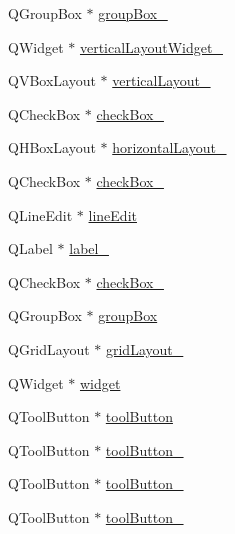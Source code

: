 \begin{DoxyCompactItemize}
Q\-Group\-Box $\ast$ \hyperlink{class_ui___shape_population_viewer_a645bc1a3805b989bfb60fdd4835c88d6}{group\-Box\-\_}
\item 
Q\-Widget $\ast$ \hyperlink{class_ui___shape_population_viewer_a5ab614d7c8de8e7d5c9f347e6a533776}{vertical\-Layout\-Widget\-\_}
\item 
Q\-V\-Box\-Layout $\ast$ \hyperlink{class_ui___shape_population_viewer_a41bb6c41ce83be21aade5f5f1cc14b4b}{vertical\-Layout\-\_}
\item 
Q\-Check\-Box $\ast$ \hyperlink{class_ui___shape_population_viewer_a1d0b21459e70bf50df0d7b096584baaf}{check\-Box\-\_}
\item 
Q\-H\-Box\-Layout $\ast$ \hyperlink{class_ui___shape_population_viewer_a9951cfa48bbeac90b3149d41bc5e9b51}{horizontal\-Layout\-\_}
\item 
Q\-Check\-Box $\ast$ \hyperlink{class_ui___shape_population_viewer_a9987cfb8cc28c513d88fd4fda358172f}{check\-Box\-\_}
\item 
Q\-Line\-Edit $\ast$ \hyperlink{class_ui___shape_population_viewer_a76a73443281f9294843ac1e2e67822ce}{line\-Edit}
\item 
Q\-Label $\ast$ \hyperlink{class_ui___shape_population_viewer_ab5eb96a308c04fad1070ded37dab571d}{label\-\_}
\item 
Q\-Check\-Box $\ast$ \hyperlink{class_ui___shape_population_viewer_a82b0e1935224c286d02c933847bb539f}{check\-Box\-\_}
\item 
Q\-Group\-Box $\ast$ \hyperlink{class_ui___shape_population_viewer_a122d88319567bbd1facdaaca34b2f202}{group\-Box}
\item 
Q\-Grid\-Layout $\ast$ \hyperlink{class_ui___shape_population_viewer_aa31e5757e3798f9648485c7f48eb3d85}{grid\-Layout\-\_}
\item 
Q\-Widget $\ast$ \hyperlink{class_ui___shape_population_viewer_a2e81b3943e7cd43edd0bd6d41b42aef7}{widget}
\item 
Q\-Tool\-Button $\ast$ \hyperlink{class_ui___shape_population_viewer_ae80dc998f4b58c43777c43cf5b2869a0}{tool\-Button}
\item 
Q\-Tool\-Button $\ast$ \hyperlink{class_ui___shape_population_viewer_a933f45c6629c5235a40cb5f5c5baaf88}{tool\-Button\-\_}
\item 
Q\-Tool\-Button $\ast$ \hyperlink{class_ui___shape_population_viewer_aec17295c3295fa64a4c79e60e99b4826}{tool\-Button\-\_}
\item 
Q\-Tool\-Button $\ast$ \hyperlink{class_ui___shape_population_viewer_a5259557488aa3aaa990b84b9cdab42f4}{tool\-Button\-\_}

\end{DoxyCompactItemize}
